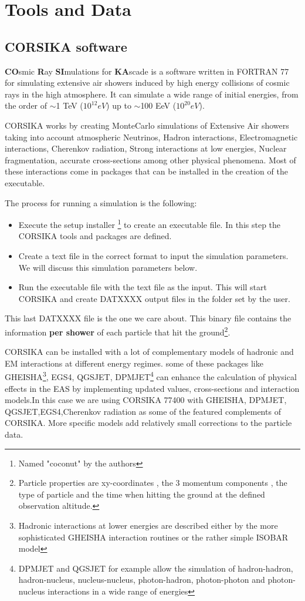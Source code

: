 \documentclass{article}
\begin{document}
\section{Tools and Data}
\subsection{CORSIKA software}
\textbf{CO}smic \textbf{R}ay \textbf{SI}mulations for \textbf{KA}scade\cite{CORSIKA} is a software written in FORTRAN 77 for simulating extensive air showers induced by high energy collisions of cosmic rays in the high atmosphere. It can simulate a wide range of initial energies, from the order of $\sim$1 TeV ($10^{12}eV$) up to $\sim$100 EeV ($10^{20}eV$).

CORSIKA works by creating MonteCarlo simulations of Extensive Air showers taking into account atmospheric Neutrinos, Hadron interactions, Electromagnetic interactions, Cherenkov radiation, Strong interactions at low energies, Nuclear fragmentation, accurate cross-sections among other physical phenomena. Most of these interactions come in packages that can be installed in the creation of the executable.  

The process for running a simulation is the following:
\begin{itemize}
    \item Execute the  setup installer \footnote{Named "coconut" by the authors} to create an executable file. In this step the CORSIKA tools and packages are defined.
    \item Create a text file in the correct format to input the simulation parameters. We will discuss this simulation parameters below.
    \item Run the executable file with the text file as the input. This will start CORSIKA and create DATXXXX output files in the folder set by the user.
\end{itemize}

This last DATXXXX file is the one we care about. This binary file contains the information \textbf{per shower} of each particle that hit the ground\footnote{Particle properties are xy-coordinates , the 3 momentum components , the type of particle and the time when hitting the ground at the defined observation altitude.}. 

CORSIKA can be installed with a lot of complementary models of hadronic and EM interactions at different energy regimes. some of these packages like GHEISHA\footnote{Hadronic interactions at lower energies are described either by the more
sophisticated GHEISHA interaction routines or the rather simple ISOBAR model}, EGS4, QGSJET, DPMJET\cite{dpmjet}\footnote{DPMJET and QGSJET for example allow the simulation of hadron-hadron, hadron-nucleus, nucleus-nucleus, photon-hadron, photon-photon and photon-nucleus interactions in a wide range of energies} can enhance the calculation of physical effects in the EAS by implementing updated values, cross-sections and interaction models.In this case we are using CORSIKA 77400 with GHEISHA, DPMJET, QGSJET,EGS4,Cherenkov radiation as some of the featured complements of CORSIKA. More specific models add relatively small corrections to the particle data.
\end{document}
